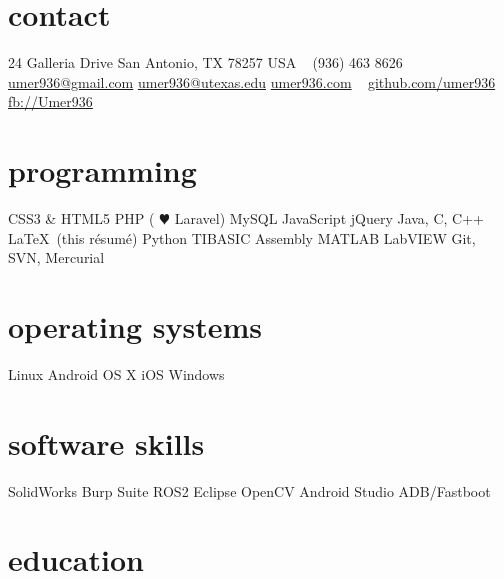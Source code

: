 \documentclass[print]{friggeri-cv} %
\begin{document}


\begin{aside} %
	\section{contact}
	24 Galleria Drive
	San Antonio, TX 78257
	USA
	~
	(936) 463 8626
	~
	\href{mailto:umer936@gmail.com}{umer936@gmail.com}
	\href{mailto:umer936@utexas.edu}{umer936@utexas.edu}
	\href{http://umer936.com}{umer936.com}
	~
	\href{http://github.com/umer936}{github.com/umer936}
	\href{http://facebook.com/Umer936}{fb://Umer936}
	~
	\section{programming}
	CSS3 \& HTML5
	PHP ({\color{red} $\varheartsuit$} Laravel)
	MySQL
	JavaScript
	jQuery
	Java, C, C++
	\LaTeX \ (this r\'esum\'e)
	Python
	TIBASIC
	Assembly
	MATLAB
	LabVIEW
	Git, SVN, Mercurial
	~
	\section{operating systems}
	Linux
	Android
	OS X
	iOS
	Windows
	~
	\section{software skills}
	SolidWorks
	Burp Suite
	ROS2
	Eclipse
	OpenCV
	Android Studio
	ADB/Fastboot
\end{aside}


\section{education}
\vspace{-10pt}
\end{document}
